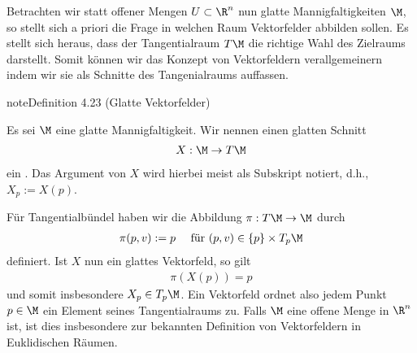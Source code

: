 \documentclass[letterpaper,10pt,german]{jupyterBook}
\begin{document}
\sphinxAtStartPar
Betrachten wir statt offener Mengen \(U\subset\R^n\) nun glatte Mannigfaltigkeiten \(\M\), so stellt sich a priori die Frage in welchen Raum Vektorfelder abbilden sollen.
Es stellt sich heraus, dass der Tangentialraum \(T\M\) die richtige Wahl des Zielraums darstellt.
Somit können wir das Konzept von Vektorfeldern verallgemeinern indem wir sie als Schnitte des Tangenialraums auffassen.
\label{manifolds/tangential:definition-30}
\begin{sphinxadmonition}{note}{Definition 4.23 (Glatte Vektorfelder)}



\sphinxAtStartPar
Es sei \(\M\) eine glatte Mannigfaltigkeit.
Wir nennen einen glatten Schnitt
\begin{equation*}
\begin{split}X:\M\to T\M\end{split}
\end{equation*}
\sphinxAtStartPar
ein .
Das Argument von \(X\) wird hierbei meist als Subskript notiert, d.h., \(X_p := X(p)\).
\end{sphinxadmonition}

\sphinxAtStartPar
Für Tangentialbündel haben wir die Abbildung \(\pi:T\M\to\M\) durch
\begin{equation*}
\begin{split}\pi(p,v):= p\quad\text{ für } (p,v)\in\{p\}\times T_p\M\end{split}
\end{equation*}
\sphinxAtStartPar
definiert.
Ist \(X\) nun ein glattes Vektorfeld, so gilt
\begin{equation*}
\begin{split}\pi(X(p)) = p\end{split}
\end{equation*}
\sphinxAtStartPar
und somit insbesondere \(X_p\in T_p\M\).
Ein Vektorfeld ordnet also jedem Punkt \(p\in\M\) ein Element seines Tangentialraums zu.
Falls \(\M\) eine offene Menge in \(\R^n\) ist, ist dies insbesondere  zur bekannten Definition von Vektorfeldern in Euklidischen Räumen.
\end{document}
